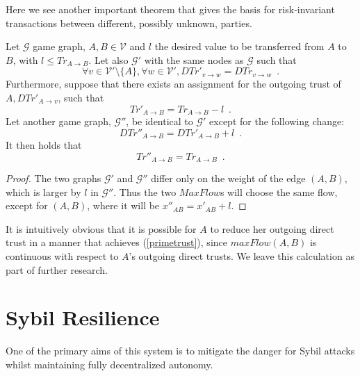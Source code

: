 \documentclass[11pt]{llncs}
\theoremstyle{definition}
\begin{document}
     Here we see another important theorem that gives the basis for risk-invariant transactions between different, possibly
     unknown, parties.
     \begin{theorem}
     \label{riskinv}
        Let $\mathcal{G}$ game graph, $A, B \in \mathcal{V}$ and $l$ the desired value to be transferred from $A$ to $B$,
        with $l \leq Tr_{A \rightarrow B}$. Let also $\mathcal{G}'$ with the same nodes as $\mathcal{G}$ such that
        \begin{equation*}
           \forall v \in \mathcal{V}' \setminus \{A\}, \forall w \in \mathcal{V}', DTr'_{v \rightarrow w} =
           DTr_{v \rightarrow w} \enspace.
        \end{equation*}
        Furthermore, suppose that there exists an assignment for the outgoing trust of $A, DTr'_{A \rightarrow v}$, such that
        \begin{equation}
        \label{primetrust}
           Tr'_{A \rightarrow B} = Tr_{A \rightarrow B} - l \enspace.
        \end{equation}
        Let another game graph, $\mathcal{G}''$, be identical to $\mathcal{G}'$ except for the following change:
        \begin{equation*}
           DTr''_{A \rightarrow B} = DTr'_{A \rightarrow B} + l \enspace.
        \end{equation*}
        It then holds that
        \begin{equation*}
           Tr''_{A \rightarrow B} = Tr_{A \rightarrow B} \enspace.
        \end{equation*}
     \end{theorem}
     \begin{proof}
        The two graphs $\mathcal{G}'$ and $\mathcal{G}''$ differ only on the weight of the edge $\left(A, B\right)$, which is
        larger by $l$ in $\mathcal{G}''$. Thus the two $MaxFlow$s will choose the same flow, except for $\left(A, B\right)$,
        where it will be $x''_{AB} = x'_{AB} + l$.
     \end{proof}
     It is intuitively obvious that it is possible for $A$ to reduce her outgoing direct trust in a manner that achieves
     (\ref{primetrust}), since $maxFlow\left(A, B\right)$ is continuous with respect to $A$'s outgoing direct trusts. We
     leave this calculation as part of further research.
  \section{Sybil Resilience}
     One of the primary aims of this system is to mitigate the danger for Sybil attacks \cite{sybilattack} whilst maintaining
     fully decentralized autonomy.
\end{document}
